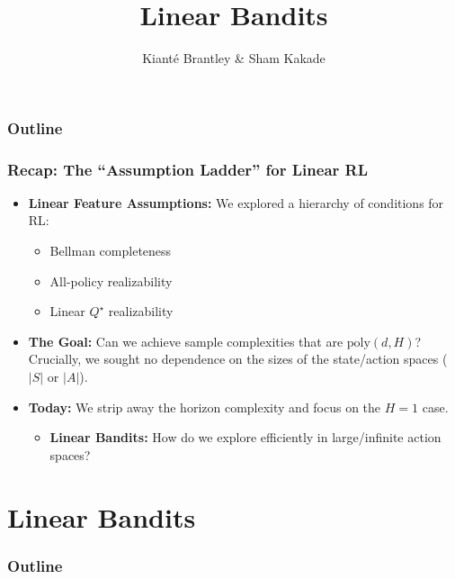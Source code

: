 \documentclass[aspectratio=169]{beamer}
\title[LinUCB]{Linear Bandits}
\author[Sham \& Kiant\'{e}]{Kiant\'{e} Brantley \& Sham Kakade}
\date{}
\begin{document}
\begin{frame}
\titlepage  
\end{frame}

\begin{frame}[noframenumbering]
  \frametitle{Outline}
  \tableofcontents
\end{frame}



\begin{frame}\frametitle{Recap: The ``Assumption Ladder'' for Linear RL}

\begin{itemize}
\item \textbf{Linear Feature Assumptions:} We explored a hierarchy of conditions for RL:
  \begin{itemize}
    \item Bellman completeness
    \item All-policy realizability
    \item Linear $Q^\star$ realizability
  \end{itemize}
  
\vspace{0.4cm}
\pause
\item \textbf{The Goal:} Can we achieve sample complexities that are $\text{poly}(d, H)$?\\
\alert{Crucially,} we sought no dependence on the sizes of the state/action spaces ($|S|$ or $|A|$).


\vspace{0.4cm}
\pause
\item \textbf{Today:} We strip away the horizon complexity and focus on the $H=1$ case. 
  \begin{itemize}
    \item \textbf{Linear Bandits:} How do we explore efficiently in large/infinite action spaces?
  \end{itemize}
\end{itemize}

\end{frame}


\section{Linear Bandits}

\begin{frame}[noframenumbering]
  \frametitle{Outline}
  \tableofcontents[currentsection]
\end{frame}
\end{document}

